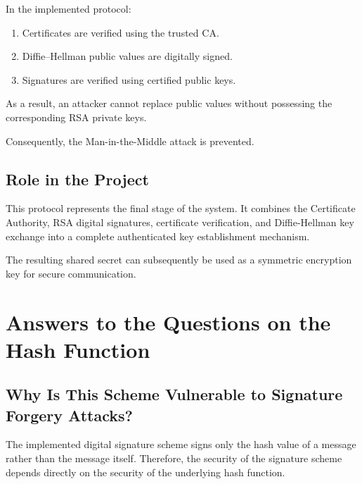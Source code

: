 \documentclass[12pt]{article}
\begin{document}
In the implemented protocol:

\begin{enumerate}
\item Certificates are verified using the trusted CA.
\item Diffie--Hellman public values are digitally signed.
\item Signatures are verified using certified public keys.
\end{enumerate}

As a result, an attacker cannot replace public values without possessing the
corresponding RSA private keys.

Consequently, the Man-in-the-Middle attack is prevented.


\subsection{Role in the Project}

This protocol represents the final stage of the system. It combines the
Certificate Authority, RSA digital signatures, certificate verification, and
Diffie-Hellman key exchange into a complete authenticated key establishment
mechanism.

The resulting shared secret can subsequently be used as a symmetric encryption
key for secure communication.
\newpage



\section{Answers to the Questions on the Hash Function}

\subsection{Why Is This Scheme Vulnerable to Signature Forgery Attacks?}

The implemented digital signature scheme signs only the hash value of a message
rather than the message itself. Therefore, the security of the signature scheme
depends directly on the security of the underlying hash function.
\end{document}
